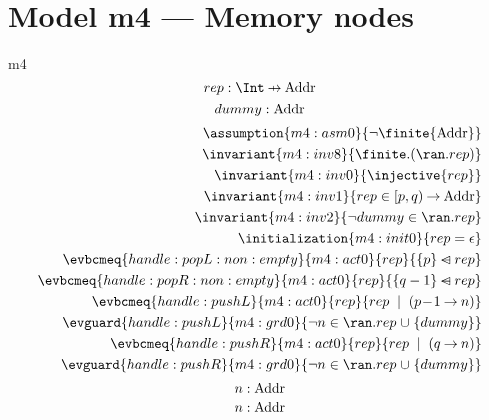 \documentclass[12pt]{amsart}
\begin{document}
\section{Model m4 --- Memory nodes}
\newcommand{\Addr}{\text{Addr}}
  
\begin{machine}{m4}
  \newset{\Addr}
  \[ \variable{ rep : \Int \pfun \Addr } \]
  \[ \constant{ dummy : \Addr } \]
  \begin{align*}
    \assumption{m4:asm0}{ \neg \finite{\Addr} } \\
    \invariant{m4:inv8}{ \finite.(\ran.rep) } \\
    \invariant{m4:inv0}{ \injective{rep} } \\
    \invariant{m4:inv1}
      { rep \in \intervalR{p}{q} \tfun \Addr } \\
    \invariant{m4:inv2}{ \neg dummy \in \ran.rep } \\
    \initialization{m4:init0}{ rep  = \emptyfun } \\
    \evbcmeq{handle:popL:non:empty}{m4:act0}
      {rep}{ \{ p \} \domsub rep } \\
    \evbcmeq{handle:popR:non:empty}{m4:act0}
      {rep}{ \{ q-1 \} \domsub rep } \\
    \evbcmeq{handle:pushL}{m4:act0}
      {rep}{ rep \2| (p\0-1 \fun n) } \\
    \evguard{handle:pushL}{m4:grd0}
      { \neg n \in \ran.rep \bunion \{dummy\} } \\
    \evbcmeq{handle:pushR}{m4:act0}
      {rep}{ rep \2| (q \fun n) }  \\
    \evguard{handle:pushR}{m4:grd0}
      { \neg n \in \ran.rep \bunion \{dummy\} } 
  \end{align*}
  \[ \param{handle:pushL}{ n : \Addr } \]
  \[ \param{handle:pushR}{ n : \Addr } \]
\end{machine}
  
\end{document}
